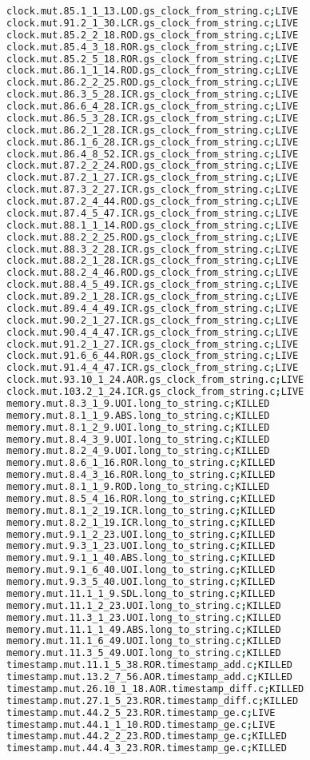 \begin{lstlisting}[language=bash, label=statuses, caption=Mutants statuses.]
clock.mut.85.1_1_13.LOD.gs_clock_from_string.c;LIVE
clock.mut.91.2_1_30.LCR.gs_clock_from_string.c;LIVE
clock.mut.85.2_2_18.ROD.gs_clock_from_string.c;LIVE
clock.mut.85.4_3_18.ROR.gs_clock_from_string.c;LIVE
clock.mut.85.2_5_18.ROR.gs_clock_from_string.c;LIVE
clock.mut.86.1_1_14.ROD.gs_clock_from_string.c;LIVE
clock.mut.86.2_2_25.ROD.gs_clock_from_string.c;LIVE
clock.mut.86.3_5_28.ICR.gs_clock_from_string.c;LIVE
clock.mut.86.6_4_28.ICR.gs_clock_from_string.c;LIVE
clock.mut.86.5_3_28.ICR.gs_clock_from_string.c;LIVE
clock.mut.86.2_1_28.ICR.gs_clock_from_string.c;LIVE
clock.mut.86.1_6_28.ICR.gs_clock_from_string.c;LIVE
clock.mut.86.4_8_52.ICR.gs_clock_from_string.c;LIVE
clock.mut.87.2_2_24.ROD.gs_clock_from_string.c;LIVE
clock.mut.87.2_1_27.ICR.gs_clock_from_string.c;LIVE
clock.mut.87.3_2_27.ICR.gs_clock_from_string.c;LIVE
clock.mut.87.2_4_44.ROD.gs_clock_from_string.c;LIVE
clock.mut.87.4_5_47.ICR.gs_clock_from_string.c;LIVE
clock.mut.88.1_1_14.ROD.gs_clock_from_string.c;LIVE
clock.mut.88.2_2_25.ROD.gs_clock_from_string.c;LIVE
clock.mut.88.3_2_28.ICR.gs_clock_from_string.c;LIVE
clock.mut.88.2_1_28.ICR.gs_clock_from_string.c;LIVE
clock.mut.88.2_4_46.ROD.gs_clock_from_string.c;LIVE
clock.mut.88.4_5_49.ICR.gs_clock_from_string.c;LIVE
clock.mut.89.2_1_28.ICR.gs_clock_from_string.c;LIVE
clock.mut.89.4_4_49.ICR.gs_clock_from_string.c;LIVE
clock.mut.90.2_1_27.ICR.gs_clock_from_string.c;LIVE
clock.mut.90.4_4_47.ICR.gs_clock_from_string.c;LIVE
clock.mut.91.2_1_27.ICR.gs_clock_from_string.c;LIVE
clock.mut.91.6_6_44.ROR.gs_clock_from_string.c;LIVE
clock.mut.91.4_4_47.ICR.gs_clock_from_string.c;LIVE
clock.mut.93.10_1_24.AOR.gs_clock_from_string.c;LIVE
clock.mut.103.2_1_24.ICR.gs_clock_from_string.c;LIVE
memory.mut.8.3_1_9.UOI.long_to_string.c;KILLED
memory.mut.8.1_1_9.ABS.long_to_string.c;KILLED
memory.mut.8.1_2_9.UOI.long_to_string.c;KILLED
memory.mut.8.4_3_9.UOI.long_to_string.c;KILLED
memory.mut.8.2_4_9.UOI.long_to_string.c;KILLED
memory.mut.8.6_1_16.ROR.long_to_string.c;KILLED
memory.mut.8.4_3_16.ROR.long_to_string.c;KILLED
memory.mut.8.1_1_9.ROD.long_to_string.c;KILLED
memory.mut.8.5_4_16.ROR.long_to_string.c;KILLED
memory.mut.8.1_2_19.ICR.long_to_string.c;KILLED
memory.mut.8.2_1_19.ICR.long_to_string.c;KILLED
memory.mut.9.1_2_23.UOI.long_to_string.c;KILLED
memory.mut.9.3_1_23.UOI.long_to_string.c;KILLED
memory.mut.9.1_1_40.ABS.long_to_string.c;KILLED
memory.mut.9.1_6_40.UOI.long_to_string.c;KILLED
memory.mut.9.3_5_40.UOI.long_to_string.c;KILLED
memory.mut.11.1_1_9.SDL.long_to_string.c;KILLED
memory.mut.11.1_2_23.UOI.long_to_string.c;KILLED
memory.mut.11.3_1_23.UOI.long_to_string.c;KILLED
memory.mut.11.1_1_49.ABS.long_to_string.c;KILLED
memory.mut.11.1_6_49.UOI.long_to_string.c;KILLED
memory.mut.11.3_5_49.UOI.long_to_string.c;KILLED
timestamp.mut.11.1_5_38.ROR.timestamp_add.c;KILLED
timestamp.mut.13.2_7_56.AOR.timestamp_add.c;KILLED
timestamp.mut.26.10_1_18.AOR.timestamp_diff.c;KILLED
timestamp.mut.27.1_5_23.ROR.timestamp_diff.c;KILLED
timestamp.mut.44.2_5_23.ROR.timestamp_ge.c;LIVE
timestamp.mut.44.1_1_10.ROD.timestamp_ge.c;LIVE
timestamp.mut.44.2_2_23.ROD.timestamp_ge.c;KILLED
timestamp.mut.44.4_3_23.ROR.timestamp_ge.c;KILLED
\end{lstlisting}


